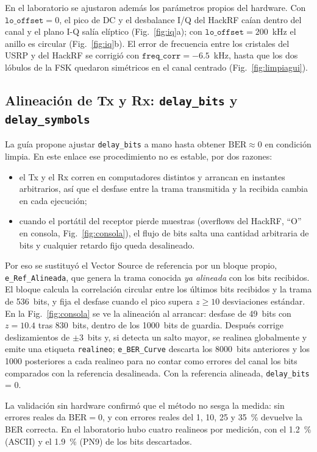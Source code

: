 \documentclass[conference]{IEEEtran}
\begin{document}
En el laboratorio se ajustaron además los parámetros propios del hardware. Con $\texttt{lo\_offset} = 0$, el pico de DC y el desbalance I/Q del HackRF caían dentro del canal y el plano I-Q salía elíptico (Fig.~\ref{fig:iq}a); con $\texttt{lo\_offset} = 200$~kHz el anillo es circular (Fig.~\ref{fig:iq}b). El error de frecuencia entre los cristales del USRP y del HackRF se corrigió con $\texttt{freq\_corr} = -6.5$~kHz, hasta que los dos lóbulos de la FSK quedaron simétricos en el canal centrado (Fig.~\ref{fig:limpiagui}).

\subsection{Alineación de Tx y Rx: \texttt{delay\_bits} y \texttt{delay\_symbols}}
\label{sec:alineacion}

La guía propone ajustar \texttt{delay\_bits} a mano hasta obtener $\text{BER} \approx 0$ en condición limpia. En este enlace ese procedimiento no es estable, por dos razones:
\begin{itemize}
\item el Tx y el Rx corren en computadores distintos y arrancan en instantes arbitrarios, así que el desfase entre la trama transmitida y la recibida cambia en cada ejecución;
\item cuando el portátil del receptor pierde muestras (overflows del HackRF, ``O'' en consola, Fig.~\ref{fig:consola}), el flujo de bits salta una cantidad arbitraria de bits y cualquier retardo fijo queda desalineado.
\end{itemize}
Por eso se sustituyó el Vector Source de referencia por un bloque propio, \texttt{e\_Ref\_Alineada}, que genera la trama conocida \emph{ya alineada} con los bits recibidos. El bloque calcula la correlación circular entre los últimos bits recibidos y la trama de 536~bits, y fija el desfase cuando el pico supera $z \geq 10$ desviaciones estándar. En la Fig.~\ref{fig:consola} se ve la alineación al arrancar: desfase de 49~bits con $z = 10.4$ tras 830~bits, dentro de los 1000~bits de guardia. Después corrige deslizamientos de $\pm 3$~bits y, si detecta un salto mayor, se realinea globalmente y emite una etiqueta \texttt{realineo}; \texttt{e\_BER\_Curve} descarta los 8000~bits anteriores y los 1000 posteriores a cada realineo para no contar como errores del canal los bits comparados con la referencia desalineada. Con la referencia alineada, \texttt{delay\_bits} = 0.

La validación sin hardware confirmó que el método no sesga la medida: sin errores reales da $\text{BER} = 0$, y con errores reales del 1, 10, 25 y 35~\% devuelve la BER correcta. En el laboratorio hubo cuatro realineos por medición, con el 1.2~\% (ASCII) y el 1.9~\% (PN9) de los bits descartados.
\end{document}
